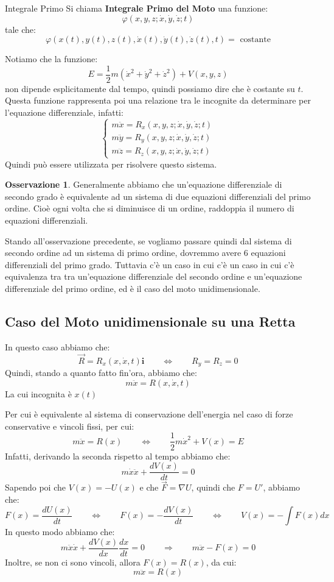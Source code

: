 \documentclass[11pt,a4paper,twoside]{article}
\theoremstyle{definition}
\newtheorem*{oss}{Osservazione}
\begin{document}
\begin{defn}{Integrale Primo}{}
	Si chiama \textbf{Integrale Primo del Moto} una funzione:
	\[ \varphi(x,y,z;\dot x, \dot y, \dot z; t) \]
	tale che:
	\[ \varphi(x(t), y(t), z(t), \dot x(t), \dot y(t), \dot z(t), t) = \text{ costante} \]
\end{defn}

Notiamo che la funzione:
\[ E = \frac 12 m (\dot x^2 + \dot y^2 + \dot z^2) + V(x,y,z) \]
non dipende esplicitamente dal tempo, quindi possiamo dire che è costante su $t$. Questa funzione rappresenta poi una relazione tra le incognite da determinare per l'equazione differenziale, infatti:
\[ \begin{cases}
	m\ddot x = R_x(x,y,z;\dot x, \dot y, \dot z; t)\\
	m\ddot y = R_y(x,y,z;\dot x, \dot y, \dot z; t)\\
	m\ddot z = R_z(x,y,z;\dot x, \dot y, \dot z; t)
\end{cases}\]
Quindi può essere utilizzata per risolvere questo sistema.

\begin{oss}
	Generalmente abbiamo che un'equazione differenziale di secondo grado è equivalente ad un sistema di due equazioni differenziali del primo ordine. Cioè ogni volta che si diminuisce di un ordine, raddoppia il numero di equazioni differenziali.
\end{oss}

Stando all'osservazione precedente, se vogliamo passare quindi dal sistema di secondo ordine ad un sistema di primo ordine, dovremmo avere $6$ equazioni differenziali del primo grado.
Tuttavia c'è un caso in cui c'è un caso in cui c'è equivalenza tra tra un'equazione differenziale del secondo ordine e un'equazione differenziale del primo ordine, ed è il caso del moto unidimensionale.

\subsection{Caso del Moto unidimensionale su una Retta}

In questo caso abbiamo che:
\[ \vec R = R_x(x,\dot x, t)\mathbf i \qquad \Leftrightarrow \qquad R_y = R_z = 0 \]
Quindi, stando a quanto fatto fin'ora, abbiamo che:
\[ m\ddot x = R(x, \dot x, t) \]
La cui incognita è $x(t)$

Per cui è equivalente al sistema di conservazione dell'energia nel caso di forze conservative e vincoli fissi, per cui:
\[ m\ddot x = R(x) \qquad \Leftrightarrow \qquad \frac 12 m\dot x^2 + V(x) = E \]
Infatti, derivando la seconda rispetto al tempo abbiamo che:
\[ m\dot x \ddot x + \frac{dV(x)}{dt} = 0 \]
Sapendo poi che $V(x) = -U(x)$ e che $\vec F = \nabla U$, quindi che $F = U'$, abbiamo che:
\[ F(x) = \frac{dU(x)}{dt} \qquad \Leftrightarrow \qquad F(x) = -\frac{dV(x)}{dt} \qquad \Leftrightarrow \qquad V(x) = - \int F(x)dx\]
In questo modo abbiamo che:
\[ m\ddot x \dot x + \frac{dV(x)}{dx} \frac{dx}{dt} = 0\qquad \Rightarrow\qquad  m\ddot x - F(x) = 0 \]
Inoltre, se non ci sono vincoli, allora $F(x) = R(x)$, da cui:
\[ m\ddot x = R(x) \]
\end{document}

